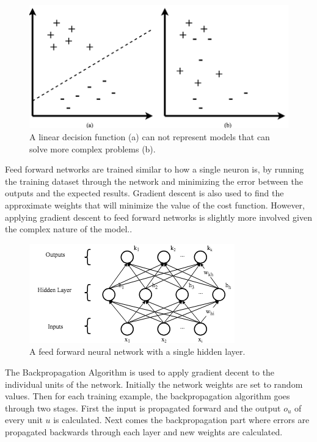 \documentclass{article}
\begin{document}
	\begin{figure}
		\centering
		\includegraphics[max width=\textwidth]{separation-surface}
		\caption{A linear decision function (a) can not represent models that can solve more complex problems (b).}
		\label{fig:separation-surface}
	\end{figure}
	
	Feed forward networks are trained similar to how a single neuron is, by running the training dataset through the network and minimizing the error between the outputs and the expected results. Gradient descent is also used to find the approximate weights that will minimize the value of the cost function. However, applying gradient descent to feed forward networks is slightly more involved given the complex nature of the model.\cite{Le15atutorial}.
	
	\begin{figure}
		\centering
		\includegraphics[max width=\textwidth]{feed-forward}
		\caption{A feed forward neural network with a single hidden layer.}
		\label{fig:feed-forward}
	\end{figure}
	
	The Backpropagation Algorithm is used to apply gradient decent to the individual units of the network\cite{Mitchell}. Initially the network weights are set to random values. Then for each training example, the backpropagation algorithm goes through two stages. First the input is propagated forward and the output $o_u$ of every unit $u$ is calculated. Next comes the backpropagation part where errors are propagated backwards through each layer and new weights are calculated.
	
\end{document}
